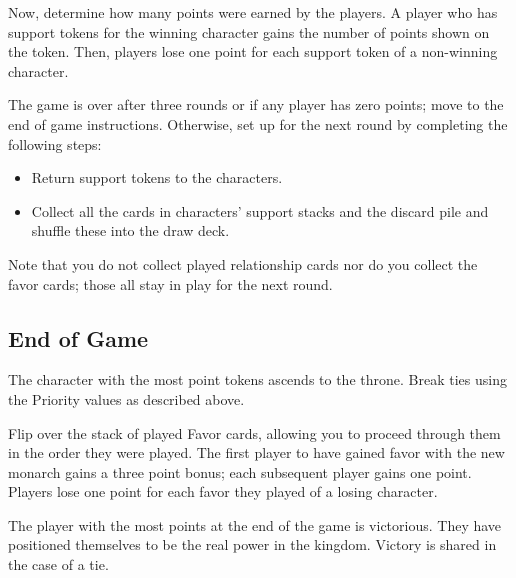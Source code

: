 \documentclass{article}
\begin{document}
Now, determine how many points were earned by the players.
A player who has support tokens for the winning character
gains the number of points shown on the token. Then, players
lose one point for each support token of a non-winning character.

The game is over after three rounds or if any player has
zero points; move to the end of game instructions.
Otherwise, set up for the next round by completing the following steps:
\begin{itemize}
\item Return support tokens to the characters.
\item Collect all the cards in characters' support stacks and the
  discard pile and shuffle these into the draw deck.
\end{itemize}

Note that you do not collect played relationship cards nor do you
collect the favor cards; those all stay in play for the next round.

\subsection*{End of Game}

The character with the most point tokens ascends to the throne.
Break ties using the Priority values as described above.

Flip over the stack of played Favor cards, allowing you to proceed
through them in the order they were played.  The first player to have
gained favor with the new monarch gains a three point bonus; each
subsequent player gains one point.  Players lose one point for each
favor they played of a losing character.

The player with the most points at the end of the game is victorious.
They have positioned themselves to be the real power in the kingdom.
Victory is shared in the case of a tie.
\end{document}

